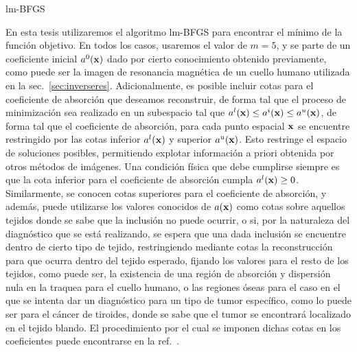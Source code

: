 \begin{algorithm}
\caption{lm-BFGS}\label{algbfgs}
\end{algorithm}  
  
En esta tesis utilizaremos el algoritmo lm-BFGS para encontrar 
el mínimo de la función objetivo. En todos los casos, usaremos el valor 
de $m=5$, y se parte de un coeficiente inicial $a^0(\mathbf{x})$ dado 
por cierto conocimiento obtenido previamente, como puede ser la imagen 
de resonancia magnética de un cuello humano utilizada en la sec.~\ref{sec:inverseres}.
Adicionalmente, es posible incluir cotas para el coeficiente 
de absorción que deseamos reconstruir, de forma tal que 
el proceso de minimización sea realizado 
en un subespacio tal que $a^l(\mathbf{x})\leq a^i(\mathbf{x}) \leq a^u(\mathbf{x})$, de forma 
tal que el coeficiente de absorción, para cada punto espacial $\mathbf{x}$ se encuentre 
restringido por las cotas inferior $a^l(\mathbf{x})$ y superior $a^u(\mathbf{x})$. Esto restringe el espacio de soluciones posibles, permitiendo explotar información a priori obtenida por otros métodos de imágenes. 
Una condición física que debe cumplirse siempre es que la cota inferior 
para el coeficiente de absorción cumpla $a^l(\mathbf{x})\geq 0$. Similarmente, 
se conocen cotas superiores para el coeficiente de absorción, y además, 
puede utilizarse los valores conocidos de $a(\mathbf{x})$ como cotas sobre 
aquellos tejidos donde se sabe que la inclusión no puede ocurrir, 
o si, por la naturaleza del diagnóstico que se está realizando, 
se espera que una dada inclusión 
se encuentre dentro de cierto tipo de tejido, restringiendo mediante cotas 
la reconstrucción para que ocurra dentro del tejido esperado, fijando los 
valores para el resto de los tejidos, como puede ser, la existencia de 
una región de absorción y dispersión nula en la traquea para el cuello 
humano, o las regiones óseas para el caso en el que se intenta dar un diagnóstico 
para un tipo de tumor específico, como lo puede ser para el cáncer de tiroides, 
donde se sabe que el tumor se encontrará localizado en el tejido blando. 
El procedimiento por el cual se imponen dichas cotas en los coeficientes 
puede encontrarse en la ref.~\cite{Byrd1995}. 

